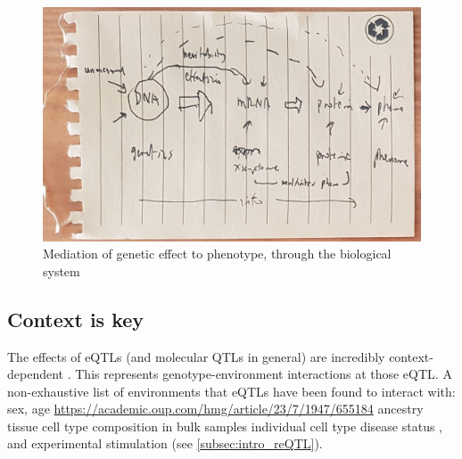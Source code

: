 \begin{outline}
\begin{figure}
    \centering
    \includegraphics[width=1.0\textwidth,page=1]{mainmatter/figures/chapter_01/fig_mockup_systemsBio_Screenshot 2020-05-21 at 17.08.47.png}
    \caption{Mediation of genetic effect to phenotype, through the biological system}
    \label{fig:intro_sysBio}
\end{figure}

\subsection{Context is key}

\1 The effects of \glspl{eQTL} (and molecular \glspl{QTL} in general) are incredibly context-dependent \autocite{albert2015RoleRegulatoryVariation,vandiedonck2017GeneticAssociationMolecular}.
    \2 This represents genotype-environment interactions at those eQTL.
    \2 A non-exhaustive list of environments that \glspl{eQTL} have been found to interact with:
        \3 sex, age \url{https://academic.oup.com/hmg/article/23/7/1947/655184}
        \3 ancestry \autocite{dejager2015ImmVarProjectInsights,nedelec2016GeneticAncestryNatural,quach2017LivingAdaptiveWorld}
        \3 tissue \autocite{nica2011ArchitectureGeneRegulatory,aguet2017GeneticEffectsGene}
        \3 cell type composition in bulk samples \autocite{westra2015CellSpecificEQTL,zhernakova2017IdentificationContextdependentExpression,glastonbury2019CellTypeHeterogeneityAdipose,kim-hellmuth2019CellTypeSpecific}
        \3 individual cell type \autocite{dimas2009CommonRegulatoryVariation,dejager2015ImmVarProjectInsights,peters2016InsightGenotypePhenotypeAssociations,chen2016GeneticDriversEpigenetic,kim-hellmuth2019CellTypeSpecific}
        \3 disease status \autocite{peters2016InsightGenotypePhenotypeAssociations},
        \3 and experimental stimulation (see \autoref{subsec:intro_reQTL}).


\end{outline}
